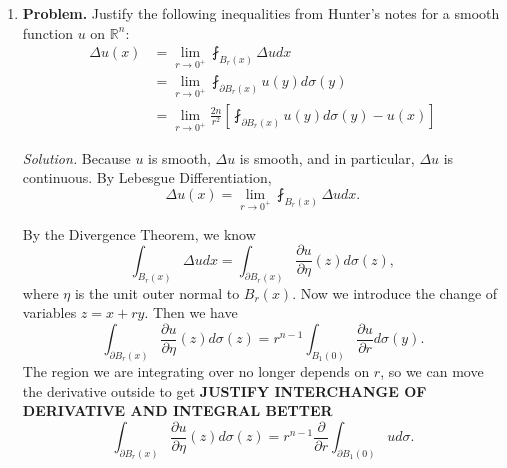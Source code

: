 \documentclass[a4paper]{article}
\newenvironment{solution}{\emph{Solution.}}{}
\newenvironment{problem}{\textbf{Problem.}}{}
\newcommand{\R}{\mathbb{R}}
\begin{document}
\begin{enumerate}
\begin{solution}
      To complete this computation, we make the substitution $y = \ln x$. Then
      \begin{align*}
        \lim_{x \to \infty} x^k u'(x) &= -2 \lim_{y \to \infty} e^{-y^2 + (k-1)y + \ln y} \\
        &= -2 \lim_{y \to \infty} y e^{-y^2 + (k-1)y} \\
        &= 0
      \end{align*}

      Taking further derivatives, similar calculations show $u(x) \in S(R)$.
    \end{solution}

  \item
    \begin{problem}
      Justify the following inequalities from Hunter's notes for a smooth function $u$ on $\R^n$:
      \begin{align*}
        \Delta u(x) &= \lim_{r \to 0^+} \fint_{B_r(x)} \Delta u dx \\
        &= \lim_{r \to 0^+} \fint_{\partial B_r(x)}^{} u(y) d\sigma(y) \\
        &= \lim_{r \to 0^+} \frac{2n}{r^2} \left[ \fint_{\partial B_r(x)}^{} u(y) d\sigma(y) - u(x) \right]
      \end{align*}

    \end{problem}

    \begin{solution}
      Because $u$ is smooth, $\Delta u$ is smooth, and in particular, $\Delta u$ is continuous. By Lebesgue Differentiation,
      \[ \Delta u(x) = \lim_{r \to 0^+} \fint_{B_r(x)}^{} \Delta u dx .\]

      By the Divergence Theorem, we know
      \[ \int_{B_r(x)}^{} \Delta u dx = \int_{\partial B_r(x)}^{} \frac{\partial u}{\partial \eta}(z) d \sigma(z) ,\]
      where $\eta$ is the unit outer normal to $B_r(x)$. Now we introduce the change of variables $z = x+ry$. Then we have
      \[ \int_{\partial B_r(x)}^{} \frac{\partial u}{\partial \eta}(z) d \sigma(z) = r^{n-1} \int_{B_1(0)}^{} \frac{\partial u}{\partial r} d
      \sigma(y) .\]
      The region we are integrating over no longer depends on $r$, so we can move the derivative outside to get
      \textbf{JUSTIFY INTERCHANGE OF DERIVATIVE AND INTEGRAL BETTER}
      \[ \int_{\partial B_r(x)}^{} \frac{\partial u}{\partial \eta}(z) d \sigma(z) = r^{n-1} \frac{\partial}{\partial r} \int_{\partial B_1(0)}^{}
      u d \sigma .\]


\end{solution}
\end{enumerate}
\end{document}
